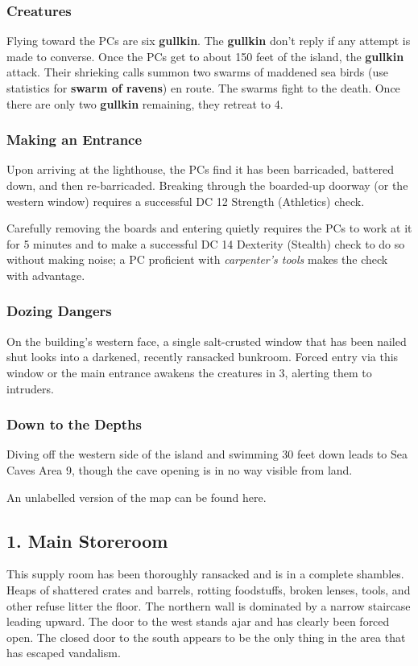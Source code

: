 \documentclass[10pt,a4paper,twoside,bg=print,twocolumn,openany,nodeprecatedcode]{dndbook}
\begin{document}
\subsubsection{Creatures}
Flying toward the PCs are six \textbf{gullkin}. The \textbf{gullkin} don't reply if any attempt is made to converse. Once the PCs get to about 150 feet of the island, the \textbf{gullkin} attack. Their shrieking calls summon two swarms of maddened sea birds (use statistics for \textbf{swarm of ravens}) en route. The swarms fight to the death. Once there are only two \textbf{gullkin} remaining, they retreat to 4.

\subsubsection{Making an Entrance}
Upon arriving at the lighthouse, the PCs find it has been barricaded, battered down, and then re-barricaded. Breaking through the boarded-up doorway (or the western window) requires a successful DC 12 Strength (Athletics) check.

Carefully removing the boards and entering quietly requires the PCs to work at it for 5 minutes and to make a successful DC 14 Dexterity (Stealth) check to do so without making noise; a PC proficient with \textit{carpenter's tools} makes the check with advantage.

\subsubsection{Dozing Dangers}
On the building's western face, a single salt-crusted window that has been nailed shut looks into a darkened, recently ransacked bunkroom. Forced entry via this window or the main entrance awakens the creatures in 3, alerting them to intruders.

\subsubsection{Down to the Depths}
Diving off the western side of the island and swimming 30 feet down leads to Sea Caves Area 9, though the cave opening is in no way visible from land.

An unlabelled version of the map can be found here.

\subsection{1. Main Storeroom}
\begin{DndReadAloud}{}
This supply room has been thoroughly ransacked and is in a complete shambles. Heaps of shattered crates and barrels, rotting foodstuffs, broken lenses, tools, and other refuse litter the floor. The northern wall is dominated by a narrow staircase leading upward. The door to the west stands ajar and has clearly been forced open. The closed door to the south appears to be the only thing in the area that has escaped vandalism.

\end{DndReadAloud}
\end{document}
